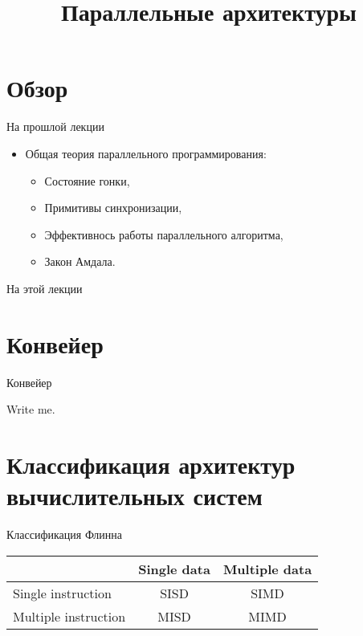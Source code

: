 

\title{Параллельные архитектуры}



\begin{frame}
\titlepage
\end{frame}

\section*{Обзор}

\begin{frame}{На прошлой лекции}

\begin{itemize}
    \item Общая теория параллельного программирования:
    \begin{itemize}
        \item Состояние гонки,
        \item Примитивы синхронизации,
        \item Эффективнось работы параллельного алгоритма,
        \item Закон Амдала.
    \end{itemize}
\end{itemize}

\end{frame}

\begin{frame}{На этой лекции}
\tableofcontents
\end{frame} 

\section{Конвейер}

\begin{frame}{Конвейер}

\todo Write me.

\end{frame}

\section{Классификация архитектур вычислительных систем}

\begin{frame}{Классификация Флинна}

\begin{table}[htp]
    \begin{center}
    \begin{tabular}{|l|c|c|}
        \hline
                                & Single data   & Multiple data \\
        \hline
        Single instruction      & SISD          & SIMD \\
        \hline
        Multiple instruction    & MISD          & MIMD \\
        \hline
    \end{tabular}
    \end{center}
\end{table}

\end{frame}

